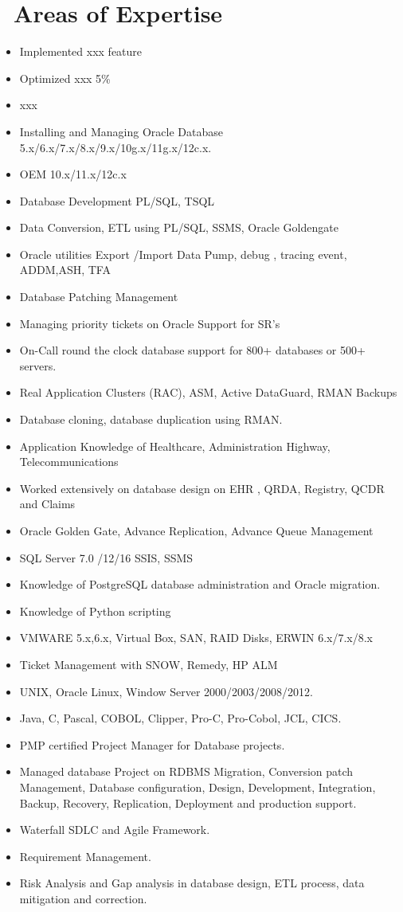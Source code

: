 \documentclass{resume}
\begin{document}
\section{\faBlackTie\ Areas of Expertise}
\begin{itemize}
  \item Implemented xxx feature
  \item Optimized xxx 5\%
  \item xxx
  \item	Installing and Managing Oracle Database 5.x/6.x/7.x/8.x/9.x/10g.x/11g.x/12c.x. 
  \item	OEM 10.x/11.x/12c.x
  \item	Database Development PL/SQL, TSQL 
  \item	Data Conversion, ETL using PL/SQL, SSMS, Oracle Goldengate
  \item	Oracle utilities Export /Import Data Pump, debug , tracing event, ADDM,ASH, TFA
  \item	Database Patching Management
  \item	Managing priority tickets on Oracle Support for  SR’s
  \item	On-Call round the clock database support for 800+ databases or 500+ servers.
  \item	Real Application Clusters (RAC), ASM, Active DataGuard,  RMAN Backups 
  \item	Database cloning, database duplication using RMAN.
  \item	Application Knowledge of Healthcare, Administration Highway, Telecommunications
  \item	Worked extensively on database design on EHR , QRDA, Registry, QCDR and Claims
  \item	Oracle Golden Gate, Advance Replication, Advance Queue Management
  \item	SQL Server 7.0 /12/16  SSIS, SSMS
  \item	Knowledge of PostgreSQL database administration and Oracle migration. 
  \item	Knowledge of Python scripting
  \item	VMWARE 5.x,6.x, Virtual Box, SAN, RAID Disks, ERWIN 6.x/7.x/8.x
  \item	Ticket Management with SNOW, Remedy, HP ALM 
  \item	UNIX, Oracle Linux, Window Server 2000/2003/2008/2012.
  \item	Java, C, Pascal, COBOL, Clipper, Pro-C, Pro-Cobol, JCL, CICS.
  \item	PMP certified Project Manager for Database projects.
  \item	Managed database Project on RDBMS Migration, Conversion patch Management, Database configuration, Design, Development, Integration, Backup, Recovery, Replication, Deployment and production support.
  \item	Waterfall SDLC and Agile Framework.
  \item	Requirement Management.
  \item	Risk Analysis and Gap analysis in database design, ETL process, data mitigation and correction.

\end{itemize}
\end{document}

